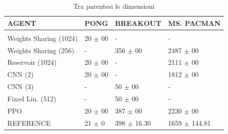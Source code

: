 \begin{table}[htbp]
    \begin{center}
        \begin{tabular}{llll}
            \multicolumn{1}{l}{AGENT}  &\multicolumn{1}{l}{\bf PONG} &\multicolumn{1}{l}{\bf BREAKOUT} &\multicolumn{1}{l}{\bf MS. PACMAN}
            \\ \hline \\
            Weights Sharing (1024) &  20 $\pm$ 00 &  - &  -  \\
            Weights Sharing (256)  &  - &  356 $\pm$ 00 &  2487 $\pm$ 00  \\
            Reservoir (1024)       &  20 $\pm$ 00 &  - &  2111 $\pm$ 00 \\
            CNN (2)                &  20 $\pm$ 00 &  - &  1812 $\pm$ 00 \\
            CNN (3)                &  - &  50 $\pm$ 00 &  - \\
            Fixed Lin. (512)                &  - &  50 $\pm$ 00 &  - \\
            PPO                    &  20 $\pm$ 00 &  387 $\pm$ 00 &  2230 $\pm$ 00 \\
            REFERENCE              &  21 $\pm$ 0 &  398 $\pm$ 16.30 &  1659 $\pm$ 144.81 \\
        \end{tabular}
    \end{center}
    \caption{Tra parentesi le dimensioni}
    \label{tab:results}
\end{table}



